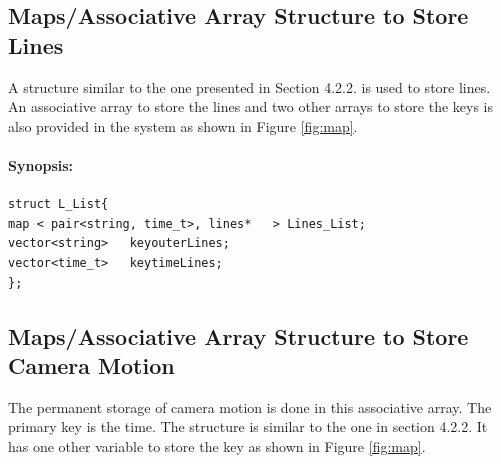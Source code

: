 \subsection{Maps/Associative Array Structure to Store Lines}
     A structure similar to the one presented in Section 4.2.2. is used to store lines. An associative array to store the lines and two other arrays to store the keys is also provided in the system as shown in Figure \ref{fig:map}.
\paragraph{Synopsis:}
\begin{lstlisting}
struct L_List{
map < pair<string, time_t>, lines*   > Lines_List;
vector<string>   keyouterLines;
vector<time_t>   keytimeLines;  
};
\end{lstlisting}

\subsection{Maps/Associative Array Structure to Store Camera Motion}
    The permanent storage of camera motion is done in this associative array. The primary key is the time. The structure is similar to the one in section 4.2.2. It has one other variable to store the key as shown in Figure \ref{fig:map}.

